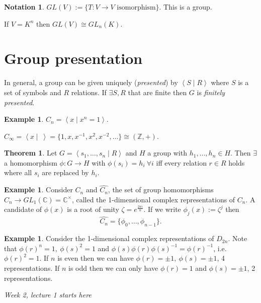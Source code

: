 \documentclass[a4paper]{article}
\newcommand{\la}{\left\langle}
\newcommand{\ra}{\right\rangle}
\newcommand{\Z}{\mathbb{Z}}
\newcommand{\C}{\mathbb{C}}
\theoremstyle{definition}
\newtheorem{thm}[defn]{Theorem}
\newtheorem{example}[defn]{Example}
\newtheorem*{notation}{Notation}
\begin{document}
\begin{notation}
$GL(V):=\{T:V\rightarrow V\text{ isomorphism}\}$. This is a group.

If $V=K^n$ then $GL(V)\cong GL_n(K)$.
\end{notation}

\section{Group presentation}
In general, a group can be given uniquely (\textit{presented}) by $\la S\mid R\ra$ where $S$ is a set of symbols and $R$ relations. If $\exists S,R$ that are finite then $G$ is \textit{finitely presented}.

\begin{example}
$C_n=\la x\mid x^n=1\ra$.

$C_\infty=\la x \mid \ \ra=\{1,x,x^{-1},x^2,x^{-2},\ldots\}\cong (\Z,+)$.
\end{example}

\begin{thm}
\label{thm:homiffrelnholds}
Let $G=\la s_1,\ldots,s_n\mid R\ra$ and $H$ a group with $h_1,\ldots,h_n\in H$. Then $\exists$ a homomorphism $\phi:G\rightarrow H$ with $\phi(s_i)=h_i \ \forall i$ iff every relation $r\in R$ holds where all $s_i$ are replaced by $h_i$.
\end{thm}

\begin{example}
\label{example:Cnrep}
Consider $C_n$ and $\widehat{C_n}$, the set of group homomorphisms $C_n\rightarrow GL_1(\C)=\C^\times$, called the 1-dimensional complex representations of $C_n$. A candidate of $\phi(x)$ is a root of unity $\zeta=e^{\frac{2\pi i}{n}}$. If we write $\phi_j(x):=\zeta^j$ then
\[
\widehat{C_n}=\{\phi_0,\ldots,\phi_{n-1}\}.
\]
\end{example}

\begin{example}
Consider the 1-dimensional complex representations of $D_{2n}$. Note that $\phi(r)^n=1,\ \phi(s)^2=1$ and $\phi(s)\phi(r)\phi(s)^{-1}=\phi(r)^{-1}$, i.e. $\phi(r)^2=1$. If $n$ is even then we can have $\phi(r)=\pm 1,\ \phi(s)=\pm 1$, 4 representations. If $n$ is odd then we can only have $\phi(r)=1$ and $\phi(s)=\pm 1$, 2 representations.
\end{example}

\begin{flushright}
\textit{Week 2, lecture 1 starts here}
\end{flushright}
\end{document}
